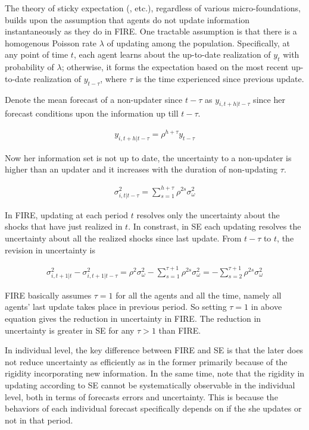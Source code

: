 \documentclass[]{article}
\begin{document}
	The theory of sticky expectation (\citet{mankiw2002sticky}, \citet{carroll2003macroeconomic} etc.), regardless of various micro-foundations, builds upon the assumption that agents do not update information instantaneously as they do in FIRE. One tractable assumption is that there is a homogenous Poisson rate $\lambda$ of updating among the population. Specifically, at any point of time $t$, each agent learns about the up-to-date realization of $y_t$ with probability of $\lambda$; otherwise, it forms the expectation based on the most recent up-to-date realization of $y_{t-\tau}$, where $\tau$ is the time experienced since previous update. 
	
	Denote the mean forecast of a non-updater since $t-\tau$ as $y_{i,t+h|t-\tau}$ since her forecast conditions upon the information up till $t-\tau$. 
	
	\begin{eqnarray} 
		y_{i,t+h|t-\tau} = \rho^{h+\tau} y_{t-\tau}
	\end{eqnarray}
	
	Now her information set is not up to date, the uncertainty to a non-updater is higher than an updater and it increases with the duration of non-updating $\tau$. 
	
	\begin{eqnarray}\label{VarSEInd}
		\sigma^2_{i,t|t-\tau}= \sum^{h+\tau}_{s=1}\rho^{2s} \sigma^2_{\omega}
	\end{eqnarray}	
	
	In FIRE, updating at each period $t$ resolves only the uncertainty about the shocks that have just realized in $t$. In constrast, in SE each updating resolves the uncertainty about all the realized shocks since last update. From $t-\tau$ to $t$, the revision in uncertainty is 
	
	\begin{eqnarray}
		\sigma^2_{i,t+1|t} - \sigma^2_{i,t+1|t-\tau} = \rho^{2} \sigma^2_{\omega} - \sum^{\tau+1}_{s=1}\rho^{2s} \sigma^2_{\omega} = -\sum^{\tau+1}_{s=2} \rho^{2s}\sigma^2_{\omega}
	\end{eqnarray}
	
	FIRE basically assumes  $\tau=1$ for all the agents and all the time, namely all agents' last update takes place in previous period. So setting $\tau =1$ in above equation gives the reduction in uncertainty in FIRE. The reduction in uncertainty is greater in SE for any $\tau>1$ than FIRE.
	
	In individual level, the key difference between FIRE and SE is that the later does not reduce uncertainty  as efficiently as in the former primarily because of the rigidity incorporating new information. In the same time, note that the rigidity in updating according to SE cannot be systematically observable in the individual level, both in terms of forecasts errors and uncertainty. This is because the behaviors of each individual forecast specifically depends on if the she updates or not in that period. 
	
\end{document}
